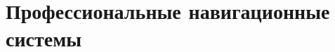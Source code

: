 \documentclass[
    fontsize=14pt, 
    DIV=12,
    headings=big,
    numbers=noenddot,
    toc=listof,      %
    toc=bib,         %
    headinclude=true,%
    footinclude=false
]{scrartcl}
\begin{document}
\part{Профессиональные навигационные системы}


\clearpage


\clearpage


\clearpage


\clearpage


\clearpage


\clearpage


\clearpage

\nocite{*}
\printbibliography[heading=bibintoc, title={Список литературы}]
\end{document}
